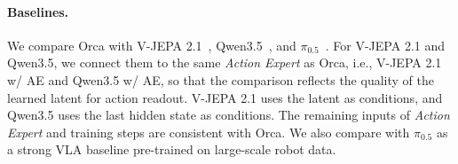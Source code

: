 \paragraph{Baselines.} 
We compare Orca with V-JEPA 2.1~\citep{V-JEPA-2.1}, Qwen3.5~\citep{qwen35}, and $\pi_{0.5}$~\citep{pi0.5}. 
For V-JEPA 2.1 and Qwen3.5, we connect them to the same \textit{Action Expert} as Orca, i.e., V-JEPA 2.1 w/ AE and Qwen3.5 w/ AE, so that the comparison reflects the quality of the learned latent for action readout. V-JEPA 2.1 uses the latent as conditions, and Qwen3.5 uses the last hidden state as conditions. The remaining inputs of \textit{Action Expert} and training steps are consistent with Orca.
We also compare with $\pi_{0.5}$ as a strong VLA baseline pre-trained on large-scale robot data. 



